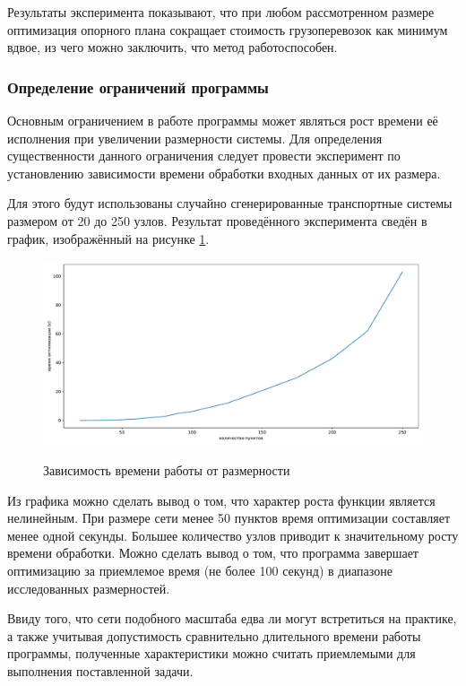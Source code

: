 \pagebreak
Результаты эксперимента показывают, что при любом рассмотренном размере оптимизация опорного плана сокращает стоимость грузоперевозок как минимум вдвое, из чего можно заключить, что метод работоспособен.

\subsubsection{Определение ограничений программы}
Основным ограничением в работе программы может являться рост времени её исполнения при увеличении размерности системы. Для определения существенности данного ограничения следует провести эксперимент по установлению зависимости времени обработки входных данных от их размера.

Для этого будут использованы случайно сгенерированные транспортные системы размером от 20 до 250 узлов. Результат проведённого эксперимента сведён в график, изображённый на рисунке \ref{exp:timing}.

\begin{figure}[h!]
	\begin{center}
		{\includegraphics[scale=0.5, angle=0, page=1]{research/timing.pdf}}
		\caption{Зависимость времени работы от размерности}
		\label{exp:timing}
	\end{center}
\end{figure}

Из графика можно сделать вывод о том, что характер роста функции является нелинейным. При размере сети менее 50 пунктов время оптимизации составляет менее одной секунды. Большее количество узлов приводит к значительному росту времени обработки. Можно сделать вывод о том, что программа завершает оптимизацию за приемлемое время (не более 100 секунд) в диапазоне исследованных размерностей. 

Ввиду того, что сети подобного масштаба едва ли могут встретиться на практике, а также учитывая допустимость сравнительно длительного времени работы программы, полученные характеристики можно считать приемлемыми для выполнения поставленной задачи.

